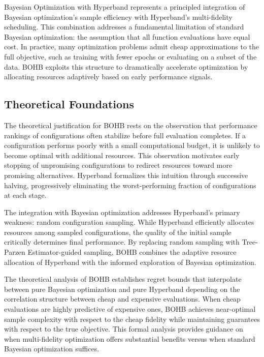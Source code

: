 Bayesian Optimization with Hyperband represents a principled integration of Bayesian optimization's sample efficiency with Hyperband's multi-fidelity scheduling. This combination addresses a fundamental limitation of standard Bayesian optimization: the assumption that all function evaluations have equal cost. In practice, many optimization problems admit cheap approximations to the full objective, such as training with fewer epochs or evaluating on a subset of the data. BOHB exploits this structure to dramatically accelerate optimization by allocating resources adaptively based on early performance signals.

\subsection{Theoretical Foundations}
\label{subsec:bohb_theory}

The theoretical justification for BOHB rests on the observation that performance rankings of configurations often stabilize before full evaluation completes. If a configuration performs poorly with a small computational budget, it is unlikely to become optimal with additional resources. This observation motivates early stopping of unpromising configurations to redirect resources toward more promising alternatives. Hyperband formalizes this intuition through successive halving, progressively eliminating the worst-performing fraction of configurations at each stage.

The integration with Bayesian optimization addresses Hyperband's primary weakness: random configuration sampling. While Hyperband efficiently allocates resources among sampled configurations, the quality of the initial sample critically determines final performance. By replacing random sampling with Tree-Parzen Estimator-guided sampling, BOHB combines the adaptive resource allocation of Hyperband with the informed exploration of Bayesian optimization.

The theoretical analysis of BOHB establishes regret bounds that interpolate between pure Bayesian optimization and pure Hyperband depending on the correlation structure between cheap and expensive evaluations. When cheap evaluations are highly predictive of expensive ones, BOHB achieves near-optimal sample complexity with respect to the cheap fidelity while maintaining guarantees with respect to the true objective. This formal analysis provides guidance on when multi-fidelity optimization offers substantial benefits versus when standard Bayesian optimization suffices.

